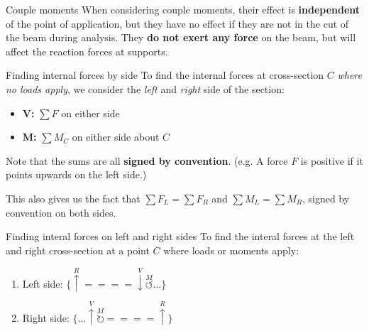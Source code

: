 \begin{knBox}
    {Couple moments}
    When considering couple moments, their effect is \textbf{independent} of the point of application, but they have no effect if they are not in the cut of the beam during analysis. They \textbf{do not exert any force} on the beam, but will affect the reaction forces at supports.
\end{knBox}

\begin{theorem}
    {Finding internal forces by side}
    To find the internal forces at cross-section $C$ \emph{where no loads apply}, we consider the \emph{left} and \emph{right} side of the section:
    \begin{itemize}
        \item \textbf{V:} $\sum F$ on either side
        \item \textbf{M:} $\sum M_C$ on either side about $C$
    \end{itemize}
    Note that the sums are all \textbf{signed by convention}. (e.g. A force $F$ is positive if it points upwards on the left side.)
    
    This also gives us the fact that $\sum F_L =\sum F_R$ and $\sum M_L =\sum M_R$, signed by convention on both sides.
\end{theorem}

\begin{knBox}
    {Finding interal forces on left and right sides}
    To find the interal forces at the left and right cross-section at a point $C$ where loads or moments apply:
    \begin{enumerate}
        \item Left side: $\{\overset{R}{\uparrow}====\overset{V}{\downarrow}\overset{M}{\circlearrowleft}\dots\}$
        \item Right side: $\{\dots\overset{V}{\uparrow}\overset{M}{\circlearrowright}====\overset{R}{\uparrow}\}$
    \end{enumerate}
\end{knBox}

